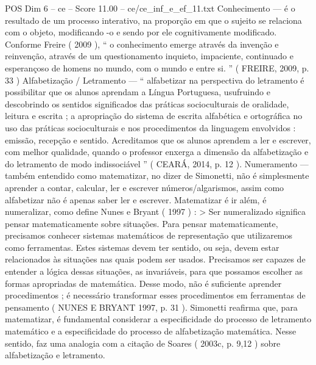 \begin{textsample}{POS Dim 6 – ce – Score 11.00 – ce/ce\_inf\_e\_ef\_11.txt}
Conhecimento — é o resultado de um processo interativo, na proporção em que o sujeito se relaciona com o objeto, modificando -o e sendo por ele cognitivamente modificado.
Conforme Freire ( 2009 ), “ o conhecimento emerge através da invenção e reinvenção, através de um questionamento inquieto, impaciente, continuado e esperançoso de homens no mundo, com o mundo e entre si. ” ( FREIRE, 2009, p. 33 ) Alfabetização / Letramento — “ alfabetizar na perspectiva do letramento é possibilitar que os alunos aprendam a Língua Portuguesa, usufruindo e descobrindo os sentidos significados das práticas socioculturais de oralidade, leitura e escrita ; a apropriação do sistema de escrita alfabética e ortográfica no uso das práticas socioculturais e nos procedimentos da linguagem envolvidos : emissão, recepção e sentido.
Acreditamos que os alunos aprendem a ler e escrever, com melhor qualidade, quando o professor enxerga a dimensão da alfabetização e do letramento de modo indissociável ” ( CEARÁ, 2014, p. 12 ).
Numeramento — também entendido como matematizar, no dizer de Simonetti, não é simplesmente aprender a contar, calcular, ler e escrever números/algarismos, assim como alfabetizar não é apenas saber ler e escrever.
Matematizar é ir além, é numeralizar, como define Nunes e Bryant ( 1997 ) : > Ser numeralizado significa pensar matematicamente sobre situações.
Para pensar matematicamente, precisamos conhecer sistemas matemáticos de representação que utilizaremos como ferramentas.
Estes sistemas devem ter sentido, ou seja, devem estar relacionados às situações nas quais podem ser usados.
Precisamos ser capazes de entender a lógica dessas situações, as invariáveis, para que possamos escolher as formas apropriadas de matemática.
Desse modo, não é suficiente aprender procedimentos ; é necessário transformar esses procedimentos em ferramentas de pensamento ( NUNES E BRYANT 1997, p. 31 ).
Simonetti reafirma que, para matematizar, é fundamental considerar a especificidade do processo de letramento matemático e a especificidade do processo de alfabetização matemática.
Nesse sentido, faz uma analogia com a citação de Soares ( 2003c, p. 9,12 ) sobre alfabetização e letramento.

\end{textsample}
